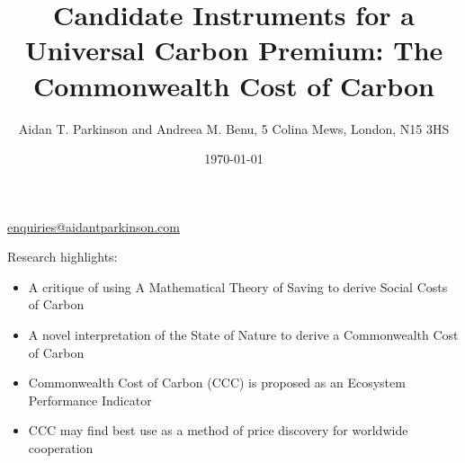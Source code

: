 \documentclass[10pt, oneside]{article}   	%
\title{Candidate Instruments for a Universal Carbon Premium: The Commonwealth Cost of Carbon}
\author{Aidan T. Parkinson and Andreea M. Benu, 5 Colina Mews, London, N15 3HS}
\date{\today}
\begin{document}
\maketitle
\begin{center}
\href{mailto:enquiries@aidantparkinson.com}{enquiries@aidantparkinson.com}
\end{center}

Research highlights:
\begin{itemize}
	\item A critique of using A Mathematical Theory of Saving to derive Social Costs of Carbon
	\item A novel interpretation of the State of Nature to derive a Commonwealth Cost of Carbon
	\item Commonwealth Cost of Carbon (CCC) is proposed as an Ecosystem Performance Indicator
	\item CCC may find best use as a method of price discovery for worldwide cooperation
\end{itemize}\\
\end{document}

